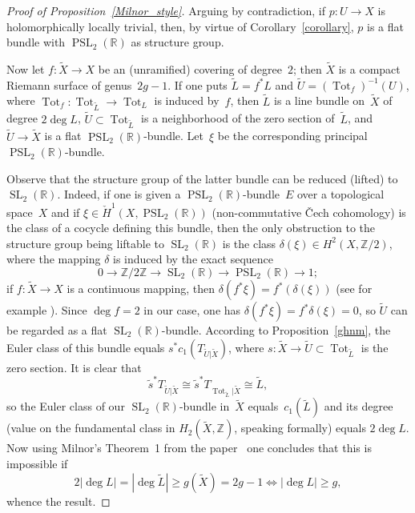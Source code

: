 \documentclass[11pt]{amsart}
\newcommand*{\R}{{\mathbb R}}
\newcommand*{\Z}{{\mathbb Z}}
\DeclareMathOperator{\PSL}{PSL}
\DeclareMathOperator{\SL}{SL}
\DeclareMathOperator{\Tot}{Tot}
\theoremstyle{remark}
\theoremstyle{definition}
\begin{document}
\begin{proof}[Proof of Proposition~\ref{Milnor_style}]
Arguing by contradiction, if $p\colon U\to X$ is holomorphically
locally trivial, then, by virtue of Corollary~\ref{corollary}, $p$
is a flat bundle with $\PSL_2(\R)$ as structure group.

Now let $f\colon \tilde X\to X$ be an (unramified) covering of
degree~$2$; then $\tilde X$ is a compact Riemann surface of
genus~$2g-1$. If one puts $\tilde L=f^*L$ and $\tilde
U=(\Tot_f)^{-1}(U)$, where $\Tot_f\colon \Tot_{\tilde L}\to\Tot_L$ is
induced by~$f$, 
then $\tilde L$ is a line bundle on~$\tilde X$ of degree $2\deg L$,
$\tilde U\subset\Tot_{\tilde L}$ is a neighborhood of the zero
section of~$\tilde L$, and $\tilde U\to\tilde X$ is a flat
$\PSL_2(\R)$-bundle. Let~$\xi$
be the corresponding principal $\PSL_2(\R)$-bundle.

Observe that the structure group of the latter bundle can be reduced
(lifted) to $\SL_2(\R)$. Indeed, if one is given a
$\PSL_2(\R)$-bundle~$E$ over a topological space~$X$ and if $\xi\in
\check H^1(X,\PSL_2(\R))$ (non-commutative \v{C}ech cohomology) is the
class of a cocycle defining this bundle, then the only obstruction to
the structure group being liftable to $\SL_2(\R)$ is the class
$\delta(\xi)\in H^2(X,\Z/2)$, where the mapping $\delta$ is induced by
the exact sequence
\begin{equation*}
0\to\Z/2\Z\to\SL_2(\R)\to\PSL_2(\R)\to 1;  
\end{equation*}
if $f\colon \tilde X\to X$ is a continuous mapping, then
$\delta(f^*\xi)=f^*(\delta(\xi))$ 
(see for example \cite[Section 1]{NWW}).
Since $\deg f=2$ in our case, one has
$\delta(f^*\xi)=f^*\delta(\xi)=0$, so $\tilde U$ can be regarded as a
flat $\SL_2(\R)$-bundle. According to Proposition~\ref{ghnm}, the
Euler class of this bundle equals $s^*c_1(T_{\tilde U|\tilde X})$, where
$s\colon \tilde X\to \tilde U\subset\Tot_{\tilde L}$ is the zero
section. It is clear that 
\begin{equation}\label{eq:rel.tan}
\tilde s^*  T_{\tilde U|\tilde X}\cong \tilde s^*  T_{\Tot_{\tilde
    L}|\tilde X}\cong \tilde L,
\end{equation}
so the Euler class of our $\SL_2(\R)$-bundle in~$\tilde X$
equals~$c_1(\tilde L)$ and its degree (value on the fundamental class
in $H_2(\tilde X,\Z)$, speaking formally) equals $2\deg L$. Now using
Milnor's Theorem~1 from the paper~\cite{Milnor} one concludes that
this is impossible if
\begin{equation*}
2|\deg L|=|\deg \tilde L|\ge g(\tilde X)=2g-1
\Leftrightarrow |\deg L|\ge g,
\end{equation*}
whence the result.
\end{proof}
\end{document}
